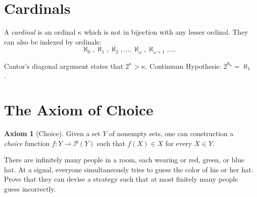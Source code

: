 \documentclass[11pt]{scrartcl}
\theoremstyle{definition}
\newtheorem{axiom}{Axiom}
\begin{document}
\section{Cardinals}
A \emph{cardinal} is an ordinal $\kappa$ which is not in bijection
with any lesser ordinal.
They can also be indexed by ordinals:
\[ \aleph_0, \aleph_1, \aleph_2, \dots, \aleph_{\omega}, \aleph_{\omega+1}, \dots \]

\begin{itemize}
  \ii Cantor's diagonal argument states that $2^\kappa > \kappa$.
  \ii Continuum Hypothesis: $2^{\aleph_0} = \aleph_1$.
\end{itemize}

\section{The Axiom of Choice}
\begin{axiom}
  [Choice] Given a set $Y$ of nonempty sets, one can construction a \emph{choice} function $f : Y \to \mathcal P(Y)$ such that $f(X) \in X$ for every $X \in Y$.
\end{axiom}
\begin{problem*}
  There are infinitely many people in a room, each wearing or red, green, or blue hat.
  At a signal, everyone simultaneously tries to guess the color of his or her hat.
  Prove that they can devise a strategy such that at most finitely many people
  guess incorrectly.
\end{problem*}

\end{document}

